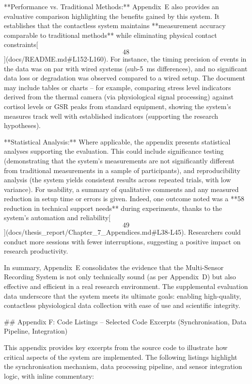 \documentclass[12pt,a4paper]{article}
\begin{document}
{**Performance vs. Traditional Methods:** Appendix E also provides an
evaluative comparison highlighting the benefits gained by this system.
It establishes that the contactless system maintains **measurement
accuracy comparable to traditional methods** while eliminating physical
contact
constraints[\[48\]](docs/README.md#L152-L160).
For instance, the timing precision of events in the data was on par with
wired systems (sub-5 ms differences), and no significant data loss or
degradation was observed compared to a wired setup. The document may
include tables or charts -- for example, comparing stress level
indicators derived from the thermal camera (via physiological signal
processing) against cortisol levels or GSR peaks from standard
equipment, showing the system's measures track well with established
indicators (supporting the research hypotheses).

**Statistical Analysis:** Where applicable, the appendix presents
statistical analyses supporting the evaluation. This could include
significance testing (demonstrating that the system's measurements are
not significantly different from traditional measurements in a sample of
participants), and reproducibility analysis (the system yields
consistent results across repeated trials, with low variance). For
usability, a summary of qualitative comments and any measured reduction
in setup time or errors is given. Indeed, one outcome noted was a **58%
reduction in technical support needs** during experiments, thanks to the
system's automation and
reliability[\[49\]](docs/thesis_report/Chapter_7_Appendices.md#L38-L45).
Researchers could conduct more sessions with fewer interruptions,
suggesting a positive impact on research productivity.

In summary, Appendix E consolidates the evidence that the Multi-Sensor
Recording System is not only technically sound (as per Appendix D) but
also effective and efficient in a real research environment. The
supplemental evaluation data underscore that the system meets its
ultimate goals: enabling high-quality, contactless physiological data
collection with ease of use and scientific integrity.

## Appendix F: Code Listings -- Selected Code Excerpts (Synchronisation, Data Pipeline, Integration)

This appendix provides key excerpts from the source code to illustrate
how critical aspects of the system are implemented. The following
listings highlight the synchronisation mechanism, data processing
pipeline, and sensor integration logic, with inline commentary:

}
\end{document}

